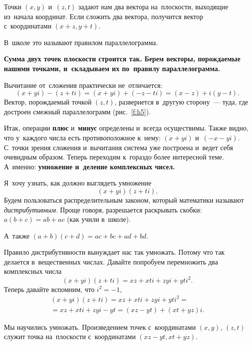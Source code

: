 
Точки $(x,y)$ и~$(z,t)$ задают нам два вектора на~плоскости, выходящие из~начала координат. Если
сложить два вектора, получится вектор с~координатами $(x+z, y+t)$.

В~школе это называют правилом параллелограмма.

\textbf{Сумма двух точек плоскости строится так. Берем векторы, порождаемые нашими точками, и~складываем их
по~правилу параллелограмма.}

Вычитание от~сложения практически не~отличается:
$$
(x+yi)-(z+ti) = (x+yi) + (-z-ti) = (x-z) + i(y-t).
$$
Вектор, порождаемый точкой $(z,t)$, развернется в~другую сторону~--- туда, где достроен смежный параллелограмм (рис.~\ref{f:h5}).

%
%


Итак, операции \textbf{плюс} и~\textbf{минус} определены и~всегда осуществимы. Также видно, что у~каждого числа есть
противоположное к~нему: $(x+yi)$ и~$(-x-yi)$. С~точки зрения сложения и~вычитания система уже построена
и~ведет себя очевидным образом. Теперь переходим к~гораздо более интересной теме. А~именно:
\textbf{умножение и~деление комплексных чисел.}

\pagebreak

Я~хочу узнать, как должно выглядеть умножение
$$
(x+yi) (z+ti).
$$
Будем пользоваться распределительным законом, который математики называют \textit{дистрибутивным}. Проще
говоря, разрешается раскрывать скобки: $a(b+c) = ab+ac$ (как учили в~школе).

А~также $(a+b)(c+d)= ac+bc+ad+bd$.

Правило дистрибутивности вынуждает нас так умножать. Потому что так делается в~вещественных числах.
Давайте попробуем перемножить два комплексных числа
$$
(x+yi) (z+ti)=xz+xti+zyi+yti^{2}.
$$
Теперь давайте вспомним, что $i^{2}=-1$,
\begin{multline*}
(x+yi) (z+ti)=xz+xti+zyi+yti^{2}=
\\=
xz+xti+zyi-yt=(xz-yt)+(xt+yz)i.
\end{multline*}

Мы научились умножать. Произведением точек с~координатами $(x,y)$, $(z,t)$ служит точка на~плоскости
с~координатами $(xz-yt,\allowbreak xt+yz)$.

